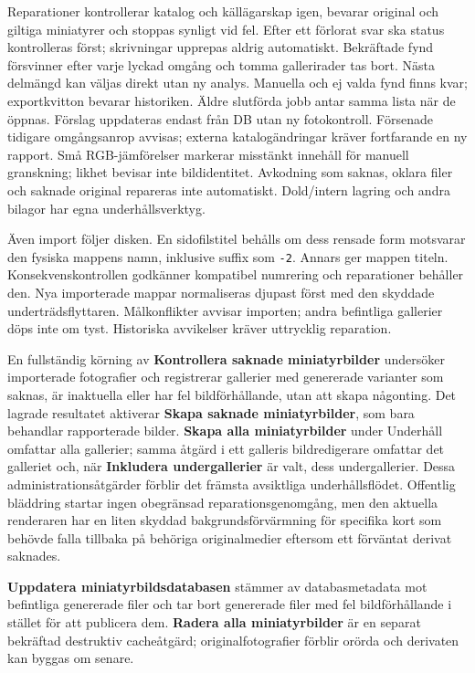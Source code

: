 \documentclass[11pt,a4paper]{article}
\newcommand{\ui}[1]{\textbf{#1}}
\newcommand{\codeword}[1]{\nolinkurl{#1}}
\begin{document}
Reparationer kontrollerar katalog och källägarskap igen, bevarar original och
giltiga miniatyrer och stoppas synligt vid fel. Efter ett förlorat svar ska
status kontrolleras först; skrivningar upprepas aldrig automatiskt. Bekräftade
fynd försvinner efter varje lyckad omgång och tomma gallerirader tas bort.
Nästa delmängd kan väljas direkt utan ny analys. Manuella och ej valda fynd
finns kvar; exportkvitton bevarar historiken. Äldre slutförda jobb antar samma
lista när de öppnas. Förslag uppdateras endast från DB utan ny fotokontroll.
Försenade tidigare omgångsanrop avvisas; externa katalogändringar kräver
fortfarande en ny rapport. Små RGB-jämförelser markerar misstänkt innehåll för
manuell granskning; likhet bevisar inte bildidentitet. Avkodning som saknas,
oklara filer och saknade original repareras inte automatiskt. Dold/intern
lagring och andra bilagor har egna underhållsverktyg.

Även import följer disken. En sidofilstitel behålls om dess rensade form
motsvarar den fysiska mappens namn, inklusive suffix som \codeword{-2}.
Annars ger mappen titeln.
Konsekvenskontrollen godkänner kompatibel numrering och reparationer behåller
den. Nya importerade
mappar normaliseras djupast först med den skyddade underträdsflyttaren.
Målkonflikter avvisar importen; andra befintliga gallerier döps inte om tyst.
Historiska avvikelser kräver uttrycklig reparation.

En fullständig körning av \ui{Kontrollera saknade miniatyrbilder} undersöker
importerade fotografier och registrerar gallerier med genererade varianter som
saknas, är inaktuella eller har fel bildförhållande, utan att skapa någonting.
Det lagrade resultatet aktiverar \ui{Skapa saknade miniatyrbilder}, som bara
behandlar rapporterade bilder. \ui{Skapa alla miniatyrbilder} under Underhåll
omfattar alla gallerier; samma åtgärd i ett galleris bildredigerare omfattar
det galleriet och, när \ui{Inkludera undergallerier} är valt, dess
undergallerier. Dessa administrationsåtgärder förblir det främsta avsiktliga
underhållsflödet. Offentlig bläddring startar ingen obegränsad
reparationsgenomgång, men den aktuella renderaren har en liten skyddad
bakgrundsförvärmning för specifika kort som behövde falla tillbaka på behöriga
originalmedier eftersom ett förväntat derivat saknades.

\ui{Uppdatera miniatyrbildsdatabasen} stämmer av databasmetadata mot
befintliga genererade filer och tar bort genererade filer med fel
bildförhållande i stället för att publicera dem. \ui{Radera alla
miniatyrbilder} är en separat bekräftad destruktiv cacheåtgärd;
originalfotografier förblir orörda och derivaten kan byggas om senare.
\end{document}
